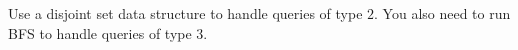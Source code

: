 Use a disjoint set data structure to handle queries of type $2$.
You also need to run BFS to handle queries of type $3$.